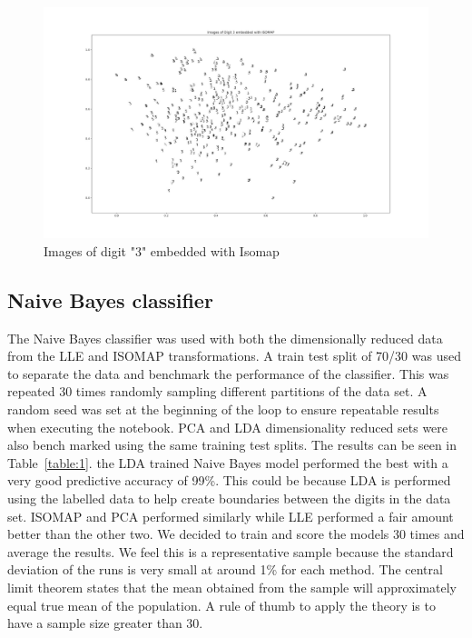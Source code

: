 \begin{figure}[htb]
 \centering
\includegraphics[width=\textwidth]{assignment1/3-2-ISOMAPembedding.png}
\caption{\label{fig:fig10}Images of digit "3" embedded with Isomap}
\end{figure}

\clearpage{}
\subsection{Naive Bayes classifier}

The Naive Bayes classifier was used with both the dimensionally reduced data from the LLE and ISOMAP transformations. A train test split of 70/30 was used to separate the data and benchmark the performance of the classifier. This was repeated 30 times randomly sampling different partitions of the data set. A random seed was set at the beginning of the loop to ensure repeatable results when executing the notebook. PCA and LDA dimensionality reduced sets were also bench marked using the same training test splits. The results can be seen in Table~\ref{table:1}. the LDA trained Naive Bayes model performed the best with a very good predictive accuracy of 99\%. This could be because LDA is performed using the labelled data to help create boundaries between the digits in the data set. ISOMAP and PCA performed similarly while LLE performed a fair amount better than the other two. We decided to train and score the models 30 times and average the results. We feel this is a representative sample because the standard deviation of the runs is very small at around 1\% for each method. The central limit theorem states that the mean obtained from the sample will approximately equal true mean of the population. A rule of thumb to apply the theory is to have a sample size greater than 30.


